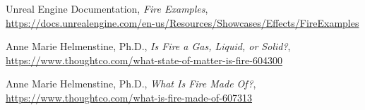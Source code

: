 \begin{thebibliography}{x}
 Unreal Engine Documentation, 
 \textit{Fire Examples},\\
 \url{https://docs.unrealengine.com/en-us/Resources/Showcases/Effects/FireExamples}

 Anne Marie Helmenstine, Ph.D., 
 \textit{Is Fire a Gas, Liquid, or Solid?},\\
 \url{https://www.thoughtco.com/what-state-of-matter-is-fire-604300}

 Anne Marie Helmenstine, Ph.D., 
 \textit{What Is Fire Made Of?},\\
 \url{https://www.thoughtco.com/what-is-fire-made-of-607313}

\end{thebibliography}

